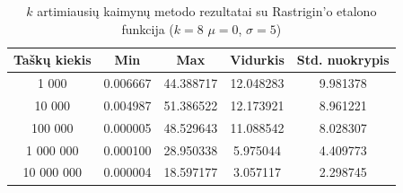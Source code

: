 \begin{table}[H]
    \centering
    \begin{tabular}{|c|c|c|c|c|}
        \hline
        \textbf{Taškų kiekis} & \textbf{Min} & \textbf{Max} & \textbf{Vidurkis} & \textbf{Std. nuokrypis} \\ \hline
        1 000        & 0.006667 & 44.388717 & 12.048283 & 9.981378 \\ \hline
        10 000       & 0.004987 & 51.386522 & 12.173921 & 8.961221 \\ \hline
        100 000      & 0.000005 & 48.529643 & 11.088542 & 8.028307 \\ \hline
        1 000 000    & 0.000100 & 28.950338 & 5.975044 & 4.409773 \\ \hline
        10 000 000   & 0.000004 & 18.597177 & 3.057117 & 2.298745 \\ \hline
    \end{tabular}
    \caption{$k$ artimiausių kaimynų metodo rezultatai su Rastrigin'o etalono funkcija ($k = 8$ $\mu = 0$, $\sigma = 5$)}
\end{table}
